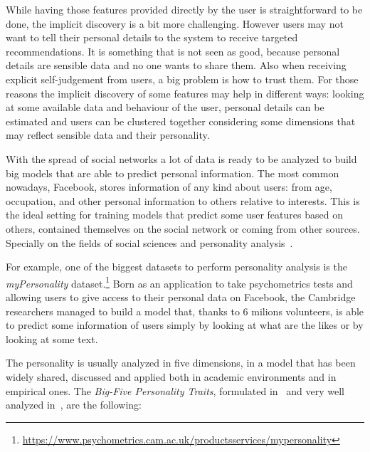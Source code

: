 While having those features provided directly by the user is straightforward to be done, the implicit discovery is a bit more challenging. However users may not want to tell their personal details to the system to receive targeted recommendations. It is something that is not seen as good, because personal details are sensible data and no one wants to share them. Also when receiving explicit self-judgement from users, a big problem is how to trust them. For those reasons the implicit discovery of some features may help in different ways: looking at some available data and behaviour of the user, personal details can be estimated and users can be clustered together considering some dimensions that may reflect sensible data and their personality.

With the spread of social networks a lot of data is ready to be analyzed to build big models that are able to predict personal information. The most common nowadays, Facebook, stores information of any kind about users: from age, occupation, and other personal information to others relative to interests. This is the ideal setting for training models that predict some user features based on others, contained themselves on the social network or coming from other sources. Specially on the fields of social sciences and personality analysis~\cite{kosinski2015facebook}.

For example, one of the biggest datasets to perform personality analysis is the \textit{myPersonality} dataset.\footnote{\url{https://www.psychometrics.cam.ac.uk/productsservices/mypersonality}} Born as an application to take psychometrics tests and allowing users to give access to their personal data on Facebook, the Cambridge researchers managed to build a model that, thanks to 6 milions volunteers, is able to predict some information of users simply by looking at what are the likes or by looking at some text.

The personality is usually analyzed in five dimensions, in a model that has been widely shared, discussed and applied both in academic environments and in empirical ones. The \textit{Big-Five Personality Traits}, formulated in~\cite{costa2008revised} and very well analyzed in~\cite{goldberg1993structure}, are the following:

